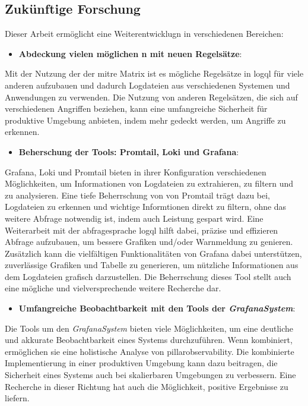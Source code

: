 \subsection{Zukünftige Forschung}
Dieser Arbeit ermöglicht eine Weiterentwicklugn in verschiedenen Bereichen:
 
\begin{itemize}[noitemsep]
    \item \textbf{Abdeckung vielen möglichen n mit neuen Regelsätze}:
\end{itemize}

Mit der Nutzung der  der \gls{mitre} Matrix ist es mögliche Regelsätze in \gls{logql} für viele anderen  aufzubauen und dadurch Logdateien aus verschiedenen Systemen und Anwendungen zu verwenden. Die Nutzung von anderen Regelsätzen, die sich auf verschiedenen Angriffen beziehen, kann eine umfangreiche Sicherheit für produktive Umgebung anbieten, indem mehr  gedeckt werden, um Angriffe zu erkennen.


\begin{itemize}[noitemsep]
    \item \textbf{Beherschung der Tools: Promtail, Loki und Grafana}:
\end{itemize}

Grafana, Loki und Promtail bieten in ihrer Konfiguration verschiedenen Möglichkeiten, um Informationen von Logdateien zu extrahieren, zu filtern und zu analysieren. Eine tiefe Beherrschung von  von Promtail trägt dazu bei, Logdateien zu erkennen und wichtige Informtionen direkt zu filtern, ohne das weitere Abfrage notwendig ist, indem auch Leistung gespart wird. Eine Weiterarbeit mit der \gls{abfragesprache} \gls{logql} hilft dabei, präzise und effizieren Abfrage aufzubauen, um bessere Grafiken und/oder Warnmeldung zu genieren. Zusätzlich kann die vielfältigen Funktionalitäten von Grafana dabei unterstützen, zuverlässige Grafiken und Tabelle zu generieren, um nützliche Informationen aus dem Logdateien grafisch darzustellen. Die Beherrschung dieses Tool stellt auch eine mögliche und vielversprechende weitere Recherche dar. 


\begin{itemize}[noitemsep]
    \item \textbf{Umfangreiche Beobachtbarkeit mit den Tools der \textit{\gls{GrafanaSystem}}}:
\end{itemize}

Die Tools um den \textit{\gls{GrafanaSystem}} bieten viele Möglichkeiten, um eine deutliche und akkurate Beobachtbarkeit eines Systems durchzuführen. Wenn kombiniert, ermöglichen sie eine holistische Analyse von \gls{pillarobservability}. Die kombinierte Implementierung in einer produktiven Umgebung kann dazu beitragen, die Sicherheit eines Systems auch bei skalierbaren Umgebungen zu verbessern. Eine Recherche in dieser Richtung hat auch die Möglichkeit, positive Ergebnisse zu liefern.


